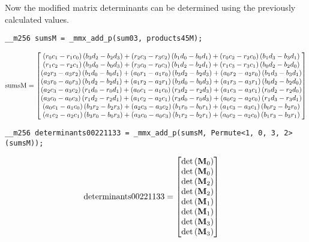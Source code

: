 Now the modified matrix determinants can be determined using the previously calculated values.

\begin{verbatim}
__m256 sumsM = _mmx_add_p(sum03, products45M);
\end{verbatim} 
\begin{align*}
\mathrm{sumsM} 
=
\begin{bmatrix}
  \left(r_0c_1 - r_1c_0\right)\left(b_3d_2 - b_2d_3\right) 
+ \left(r_2c_3 - r_3c_2\right)\left(b_1d_0 - b_0d_1\right)
+ \left(r_0c_2 - r_2c_0\right)\left(b_1d_3 - b_3d_1\right)\\
  \left(r_1c_2 - r_2c_1\right)\left(b_3d_0 - b_0d_3\right)
+ \left(r_3c_0 - r_0c_3\right)\left(b_1d_2 - b_2d_1\right)
+ \left(r_1c_3 - r_3c_1\right)\left(b_0d_2 - b_2d_0\right)\\
  \left(a_2r_3 - a_3r_2\right)\left(b_1d_0 - b_0d_1\right)
+ \left(a_0r_1 - a_1r_0\right)\left(b_3d_2 - b_2d_3\right)
+ \left(a_0r_2 - a_2r_0\right)\left(b_1d_3 - b_3d_1\right)\\
  \left(a_3r_0 - a_0r_3\right)\left(b_1d_2 - b_2d_1\right)
+ \left(a_1r_2 - a_2r_1\right)\left(b_3d_0 - b_0d_3\right)
+ \left(a_1r_3 - a_3r_1\right)\left(b_0d_2 - b_2d_0\right)\\
  \left(a_2c_3 - a_3c_2\right)\left(r_1d_0 - r_0d_1\right)
+ \left(a_0c_1 - a_1c_0\right)\left(r_3d_2 - r_2d_3\right)
+ \left(a_1c_3 - a_3c_1\right)\left(r_0d_2 - r_2d_0\right)\\
  \left(a_3c_0 - a_0c_3\right)\left(r_1d_2 - r_2d_1\right)
+ \left(a_1c_2 - a_2c_1\right)\left(r_3d_0 - r_0d_3\right)
+ \left(a_0c_2 - a_2c_0\right)\left(r_1d_3 - r_3d_1\right)\\
  \left(a_0c_1 - a_1c_0\right)\left(b_3r_2 - b_2r_3\right)
+ \left(a_2c_3 - a_3c_2\right)\left(b_1r_0 - b_0r_1\right)
+ \left(a_1c_3 - a_3c_1\right)\left(b_0r_2 - b_2r_0\right)\\
  \left(a_1c_2 - a_2c_1\right)\left(b_3r_0 - b_0r_3\right)
+ \left(a_3c_0 - a_0c_3\right)\left(b_1r_2 - b_2r_1\right)
+ \left(a_0c_2 - a_2c_0\right)\left(b_1r_3 - b_3r_1\right)\\
\end{bmatrix}
\end{align*}

\begin{verbatim}
__m256 determinants00221133 = _mmx_add_p(sumsM, Permute<1, 0, 3, 2>(sumsM));
\end{verbatim} 
\begin{align*}
\mathrm{determinants00221133} 
&=
\begin{bmatrix}
\mathrm{det}\left(\mathbf{M}_0\right)\\
\mathrm{det}\left(\mathbf{M}_0\right)\\
\mathrm{det}\left(\mathbf{M}_2\right)\\
\mathrm{det}\left(\mathbf{M}_2\right)\\
\mathrm{det}\left(\mathbf{M}_1\right)\\
\mathrm{det}\left(\mathbf{M}_1\right)\\
\mathrm{det}\left(\mathbf{M}_3\right)\\
\mathrm{det}\left(\mathbf{M}_3\right)\\
\end{bmatrix}
\end{align*}


